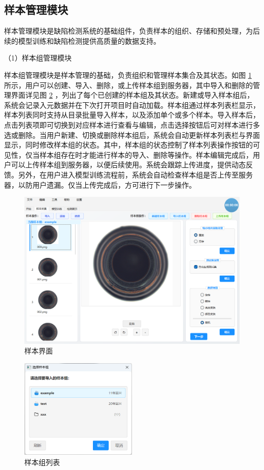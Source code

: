 \documentclass[
  ]{njuthesis}
\begin{document}
\subsection{样本管理模块}

样本管理模块是缺陷检测系统的基础组件，负责样本的组织、存储和预处理，为后续的模型训练和缺陷检测提供高质量的数据支持。

（1）样本组管理模块

样本组管理模块是样本管理的基础，负责组织和管理样本集合及其状态。如图 \ref{样本界面} 所示，用户可以创建、导入、删除，或上传样本组到服务器，其中导入和删除的管理界面详见图 \ref{样本组列表} ，列出了每个已创建的样本组及其状态。新建或导入样本组后，系统会记录入元数据并在下次打开项目时自动加载。样本组通过样本列表栏显示，样本列表同时支持从目录批量导入样本，以及添加单个或多个样本。导入样本后，点击列表项即可切换到对应样本进行查看与编辑，点击选择按钮后可对样本进行多选或删除。当用户新建、切换或删除样本组后，系统会自动更新样本列表栏与界面显示，同时修改样本组的状态。其中，样本组的状态控制了样本列表操作按钮的可见性，仅当样本组存在时才能进行样本的导入、删除等操作。样本编辑完成后，用户可以上传样本组到服务器，以便后续使用。系统会跟踪上传进度，提供动态反馈。另外，在用户进入模型训练流程前，系统会自动检查样本组是否上传至服务器，以防用户遗漏。仅当上传完成后，方可进行下一步操作。

\begin{figure}[htb]
    \centering
    \includegraphics[width=\textwidth]{images/样本界面.png}
    \caption{样本界面}
    \label{样本界面}
\end{figure}

\begin{figure}[htb]
    \centering
    \includegraphics[width=0.5\textwidth]{images/样本组列表.png}
    \caption{样本组列表}
    \label{样本组列表}
\end{figure}
\end{document}

